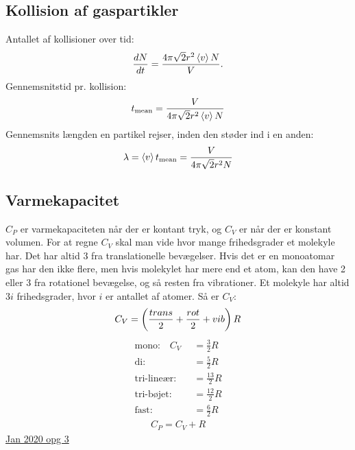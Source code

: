 \documentclass[a4paper,oneside,article]{memoir}
\begin{document}
\subsection{Kollision af gaspartikler} \label{ssc:kollisionidealgas}
Antallet af kollisioner over tid: \[\frac{dN}{dt}=\frac{4\pi \sqrt{2}r^2\br[3]{v}N}{V}.\]
Gennemsnitstid pr. kollision: \[t_\text{mean}=\frac{V}{4\pi \sqrt{2}r^2\br[3]{v}N}\]
Gennemsnits længden en partikel rejser, inden den støder ind i en anden: \[\lambda = \br[3]{v}t_\text{mean}=\frac{V}{4\pi \sqrt{2}r^2N}\]

\subsection{Varmekapacitet} \label{ssc:varmekapacitet}
$C_P$ er varmekapaciteten når der er kontant tryk, og $C_V$ er når der er konstant volumen. 
For at regne $C_V$ skal man vide hvor mange frihedsgrader et molekyle har. Det har altid 3 fra translationelle bevægelser. Hvis det er en monoatomar gas har den ikke flere, men hvis molekylet har mere end et atom, kan den have 2 eller 3 fra rotationel bevægelse, og så resten fra vibrationer. 
Et molekyle har altid $3i$ frihedsgrader, hvor $i$ er antallet af atomer. 
Så er $C_V$: \[C_V=\br{\frac{trans}{2}+\frac{rot}{2}+vib}R\]
\begin{align*}
    \text{mono:}\quad C_V&=\frac{3}{2}R \\
    \text{di:} \quad\quad &= \frac{5}{2}R \\
    \text{tri-lineær:}\quad &= \frac{13}{2}R \\
    \text{tri-bøjet:}\quad &= \frac{12}{2}R\\
    \text{fast:} \quad &= \frac{6}{2}R
\end{align*}
\begin{align*}
    C_P = C_V+R
\end{align*}
\hyperref[asc:Jan 2020 opg 3]{Jan 2020 opg 3}
\end{document}

